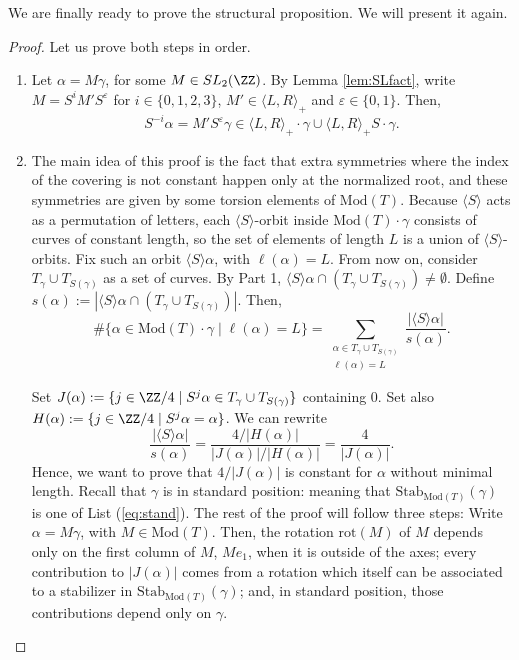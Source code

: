 \documentclass{article}
\begin{document}
    We are finally ready to prove the structural proposition. We will present it again.
	
	\twotrees*
	
	\begin{proof}Let us prove both steps in order.
		\begin{enumerate}
			\item Let $\alpha=M \gamma$, for some $M\in SL_2(\ZZ)$. By Lemma \ref{lem:SLfact}, write $M=S^i M' S^\varepsilon$ for $i\in\{0,1,2,3\}$, $M'\in \langle L,R\rangle_+$ and $\varepsilon\in\{0,1\}$. Then, 
			\[
			S^{-i} \alpha =M' S^\varepsilon \gamma\in \langle L,R\rangle_+\cdot  \gamma \cup \langle L,R \rangle_+ S \cdot \gamma.
			\]
			\item 
			The main idea of this proof is the fact that extra symmetries where the index of the covering is not constant happen only at the normalized root, and these symmetries are given by some torsion elements of $\mathrm{Mod}(T)$. Because $\langle S \rangle$ acts as a permutation of letters, each $\langle S \rangle$-orbit inside $\mathrm{Mod}(T)\cdot \gamma$ consists of curves of constant length, so the set of elements of length $L$ is a union of $\langle S \rangle$-orbits. Fix such an orbit $\langle S \rangle  \alpha$, with $\ell(\alpha)=L$. From now on, consider $T_\gamma\cup T_{S(\gamma)}$ as a set of curves. By Part 1, $\langle S \rangle  \alpha\cap (T_\gamma\cup T_{S(\gamma)})\neq\emptyset$. Define $s(\alpha):= |\langle S \rangle \alpha \cap (T_\gamma\cup T_{S(\gamma)})|$. Then, 
			\[
			\#\{\alpha\in\mathrm{Mod}(T)\cdot \gamma\mid \ell(\alpha)=L\}=\sum_{\substack{\alpha\in T_\gamma\cup T_{S(\gamma)} \\ \ell(\alpha)=L}} \frac{|\langle S \rangle \alpha| }{s(\alpha)}.
			\]
			
			Set $J(\alpha):= \{j\in\ZZ/4\mid S^j\alpha\in T_\gamma \cup T_{S(\gamma)}\}$ containing $0$. Set also $H(\alpha):= \{j\in \ZZ/4\mid S^j\alpha=\alpha\}$. We can rewrite 
			\[
			\frac{|\langle S \rangle \alpha| }{s(\alpha)} = \frac{4/|H(\alpha)|}{|J(\alpha)|/|H(\alpha)|}=\frac{4}{|J(\alpha)|}.
			\]
			Hence, we want to prove that $4/|J(\alpha)|$ is constant for $\alpha$ without minimal length.
			Recall that $\gamma$ is in standard position: meaning that $\mathrm{Stab}_{\mathrm{Mod}(T)}(\gamma)$ is one of List (\ref{eq:stand}). The rest of the proof will follow three steps: Write $\alpha=M \gamma$, with $M\in\mathrm{Mod}(T)$. Then, the rotation $\mathrm{rot}(M)$ of $M$ depends only on the first column of $M$, $Me_1$, when it is outside of the axes; every contribution to $|J(\alpha)|$ comes from a rotation which itself can be associated to a stabilizer in $\mathrm{Stab}_{\mathrm{Mod}(T)}(\gamma)$; and, in standard position, those contributions depend only on $\gamma$.


\end{enumerate}
\end{proof}
\end{document}
